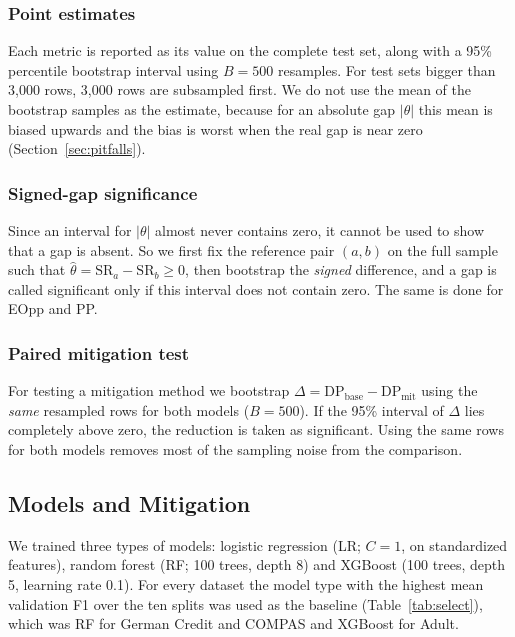 \documentclass[conference]{IEEEtran}
\newcommand{\DP}{\mathrm{DP}}
\begin{document}
\subsubsection{Point estimates} Each metric is reported as its value on the complete test set, along with a 95\% percentile bootstrap interval using $B=500$ resamples. For test sets bigger than 3{,}000 rows, 3{,}000 rows are subsampled first. We do not use the mean of the bootstrap samples as the estimate, because for an absolute gap $|\theta|$ this mean is biased upwards and the bias is worst when the real gap is near zero (Section~\ref{sec:pitfalls}).

\subsubsection{Signed-gap significance} Since an interval for $|\theta|$ almost never contains zero, it cannot be used to show that a gap is absent. So we first fix the reference pair $(a,b)$ on the full sample such that $\hat\theta=\mathrm{SR}_a-\mathrm{SR}_b\ge 0$, then bootstrap the \emph{signed} difference, and a gap is called significant only if this interval does not contain zero. The same is done for EOpp and PP.

\subsubsection{Paired mitigation test} For testing a mitigation method we bootstrap $\Delta=\DP_{\text{base}}-\DP_{\text{mit}}$ using the \emph{same} resampled rows for both models ($B=500$). If the 95\% interval of $\Delta$ lies completely above zero, the reduction is taken as significant. Using the same rows for both models removes most of the sampling noise from the comparison.

\subsection{Models and Mitigation}
We trained three types of models: logistic regression (LR; $C{=}1$, on standardized features), random forest (RF; 100 trees, depth 8) and XGBoost (100 trees, depth 5, learning rate 0.1). For every dataset the model type with the highest mean validation F1 over the ten splits was used as the baseline (Table~\ref{tab:select}), which was RF for German Credit and COMPAS and XGBoost for Adult.
\end{document}
